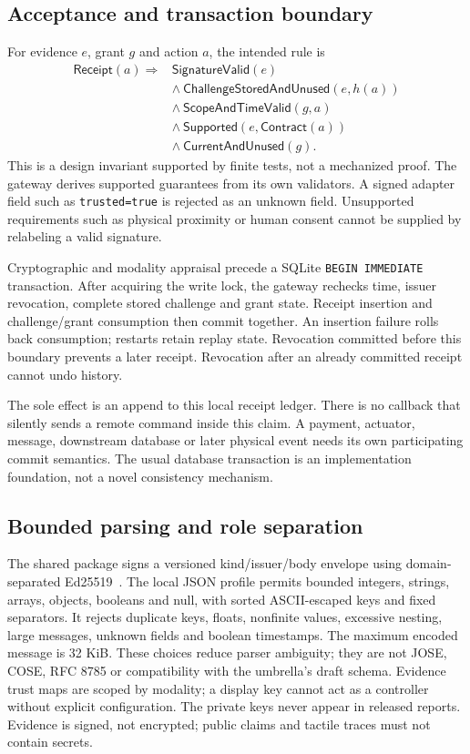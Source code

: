 \subsection{Acceptance and transaction boundary}
For evidence $e$, grant $g$ and action $a$, the intended rule is
\begin{align}
\mathsf{Receipt}(a) \Rightarrow {}& \mathsf{SignatureValid}(e) \nonumber\\
 &\land\ \mathsf{ChallengeStoredAndUnused}(e,h(a)) \nonumber\\
 &\land\ \mathsf{ScopeAndTimeValid}(g,a) \nonumber\\
 &\land\ \mathsf{Supported}(e,\mathsf{Contract}(a)) \nonumber\\
 &\land\ \mathsf{CurrentAndUnused}(g).
\end{align}
This is a design invariant supported by finite tests, not a mechanized proof.
The gateway derives supported guarantees from its own validators. A signed
adapter field such as \texttt{trusted=true} is rejected as an unknown field.
Unsupported requirements such as physical proximity or human consent cannot be
supplied by relabeling a valid signature.

Cryptographic and modality appraisal precede a SQLite \texttt{BEGIN IMMEDIATE}
transaction. After acquiring the write lock, the gateway rechecks time, issuer
revocation, complete stored challenge and grant state. Receipt insertion and
challenge/grant consumption then commit together. An insertion failure rolls
back consumption; restarts retain replay state. Revocation committed before this
boundary prevents a later receipt. Revocation after an already committed receipt
cannot undo history.

The sole effect is an append to this local receipt ledger. There is no callback
that silently sends a remote command inside this claim. A payment, actuator,
message, downstream database or later physical event needs its own participating
commit semantics. The usual database transaction is an implementation foundation,
not a novel consistency mechanism.

\subsection{Bounded parsing and role separation}
The shared package signs a versioned kind/issuer/body envelope using
domain-separated Ed25519~\cite{eddsa}. The local JSON profile permits bounded
integers, strings, arrays, objects, booleans and null, with sorted ASCII-escaped
keys and fixed separators. It rejects duplicate keys, floats, nonfinite values,
excessive nesting, large messages, unknown fields and boolean timestamps. The
maximum encoded message is 32 KiB. These choices reduce parser ambiguity; they
are not JOSE, COSE, RFC 8785 or compatibility with the umbrella's draft schema.
Evidence trust maps are scoped by modality; a display key cannot act as a
controller without explicit configuration. The private keys never appear in released reports. Evidence is signed, not
encrypted; public claims and tactile traces must not contain secrets.

